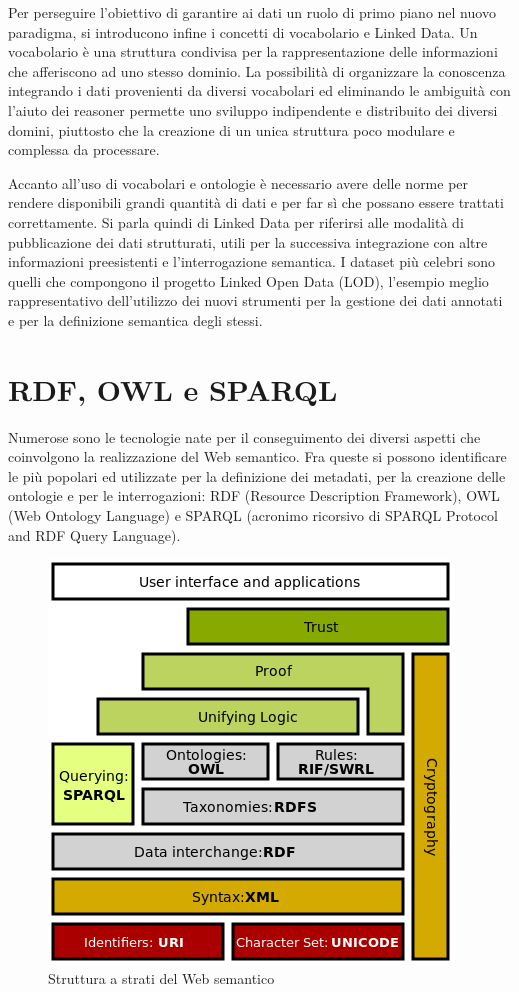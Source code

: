 \documentclass[Lau,binding=0.6cm,noexaminfo,oneside]{sapthesis}
\begin{document}
Per perseguire l'obiettivo di garantire ai dati un ruolo di primo piano nel nuovo paradigma, si introducono infine i concetti di vocabolario e Linked Data. Un vocabolario è una struttura condivisa per la rappresentazione delle informazioni che afferiscono ad uno stesso dominio.
La possibilità di organizzare la conoscenza integrando i dati provenienti da diversi vocabolari ed eliminando le ambiguità con l'aiuto dei reasoner permette uno sviluppo indipendente e distribuito dei diversi domini, piuttosto che la creazione di un unica struttura poco modulare e complessa da processare.\medskip

Accanto all'uso di vocabolari e ontologie è necessario avere delle norme per rendere disponibili grandi quantità di dati e per far sì che possano essere trattati correttamente. Si parla quindi di Linked Data per riferirsi alle modalità di pubblicazione dei dati strutturati, utili per la successiva integrazione con altre informazioni preesistenti e l'interrogazione semantica.
I dataset più celebri sono quelli che compongono il progetto Linked Open Data (LOD), l'esempio meglio rappresentativo dell'utilizzo dei nuovi strumenti per la gestione dei dati annotati e per la definizione semantica degli stessi.\medskip

\clearpage

\section{RDF, OWL e SPARQL}

Numerose sono le tecnologie nate per il conseguimento dei diversi aspetti che coinvolgono la realizzazione del Web semantico. Fra queste si possono identificare le più popolari ed utilizzate per la definizione dei metadati, per la creazione delle ontologie e per le interrogazioni: RDF (Resource Description Framework), OWL (Web Ontology Language) e SPARQL (acronimo ricorsivo di SPARQL Protocol and RDF Query Language).\medskip

\begin{figure}[!ht]
  \centering
  \includegraphics[scale=0.45]{pila.png}
  \caption{Struttura a strati del Web semantico}
\end{figure}
\end{document}
